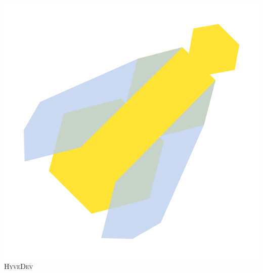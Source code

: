 \documentclass[11pt]{scrartcl}
\begin{document}
\begin{center}
	\includegraphics[width=.8\linewidth]{hyvedev-logo-icon.pdf} \\
	{\textsc{\Huge{\sffamily HyveDev}}}
\end{center}
\end{document}
